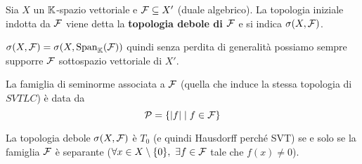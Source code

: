 \begin{definition}
Sia $X$ un $\mathbb{K}$-spazio vettoriale e $\mathcal{F}\subseteq X'$ (duale algebrico). La topologia iniziale indotta da $\mathcal{F}$ viene detta la \textbf{topologia debole di $\mathcal{F}$} e si indica $\sigma(X,\mathcal{F})$.
\end{definition}

\begin{remark}
$\sigma(X,\mathcal{F})=\sigma(X,\operatorname{Span}_{\mathbb{K}}(\mathcal{F}))$ quindi senza perdita di generalit\`a possiamo sempre supporre $\mathcal{F}$ sottospazio vettoriale di $X'$.
\end{remark}

\begin{remark}
La famiglia di seminorme associata a $\mathcal{F}$ (quella che induce la stessa topologia di $SVTLC$) \`e data da
\[\mathcal{P}=\left\{{\left|{f}\right|\mid f\in\mathcal{F}}\right\}\]
\end{remark}

\begin{remark}
La topologia debole $\sigma(X,\mathcal{F})$ \`e $T_0$ (e quindi Hausdorff perch\'e SVT) se e solo se la famiglia $\mathcal{F}$ \`e separante ($\forall x\in X\setminus\{0\},\ \exists f\in\mathcal{F}$ tale che $f(x)\neq0$).
\end{remark}



